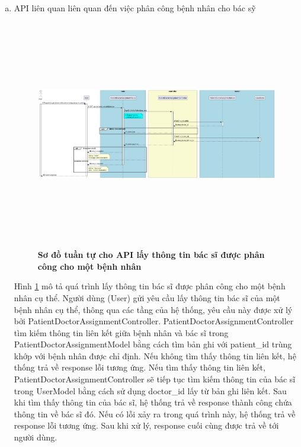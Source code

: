 \begin{enumerate}[a)]
\item API liên quan liên quan đến việc phân công bệnh nhân cho bác sỹ



\begin{figure}[H]
  \centering
  \includegraphics[width=16cm,height=10cm]{Images/server/sequence/server/getDoctorByPatient.png}
  \caption[Sơ đồ tuần tự cho API lấy thông tin bác sĩ được phân công cho một bệnh nhân ]{\bfseries \fontsize{12pt}{0pt}
  \selectfont Sơ đồ tuần tự cho API lấy thông tin bác sĩ được phân công cho một bệnh nhân }
  \label{getDoctorByPatient} %
\end{figure}
Hình \ref{getDoctorByPatient} mô tả quá trình lấy thông tin bác sĩ được phân công cho một bệnh nhân cụ thể. Người dùng (User) gửi yêu cầu lấy thông tin bác sĩ của một bệnh nhân cụ thể, thông qua các tầng của hệ thống, yêu cầu này được xử lý bởi PatientDoctorAssignmentController. PatientDoctorAssignmentController tìm kiếm thông tin liên kết giữa bệnh nhân và bác sĩ trong PatientDoctorAssignmentModel bằng cách tìm bản ghi với patient\_id trùng khớp với bệnh nhân được chỉ định. Nếu không tìm thấy thông tin liên kết, hệ thống trả về response lỗi tương ứng. Nếu tìm thấy thông tin liên kết, PatientDoctorAssignmentController sẽ tiếp tục tìm kiếm thông tin của bác sĩ trong UserModel bằng cách sử dụng doctor\_id lấy từ bản ghi liên kết. Sau khi tìm thấy thông tin của bác sĩ, hệ thống trả về response thành công chứa thông tin về bác sĩ đó. Nếu có lỗi xảy ra trong quá trình này, hệ thống trả về response lỗi tương ứng. Sau khi xử lý, response cuối cùng được trả về tới người dùng.



\end{enumerate}
